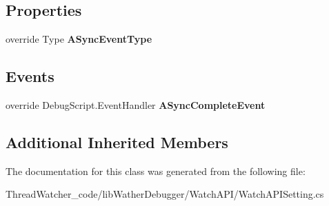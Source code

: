 \subsection*{Properties}
\begin{DoxyCompactItemize}
\item 
\hypertarget{classlib_wather_debugger_1_1_watch_a_p_i_1_1_watch_a_p_i_setting_aa526b2668d58e8615058f655cd7815c9}{override Type {\bfseries A\+Sync\+Event\+Type}}\label{classlib_wather_debugger_1_1_watch_a_p_i_1_1_watch_a_p_i_setting_aa526b2668d58e8615058f655cd7815c9}

\end{DoxyCompactItemize}
\subsection*{Events}
\begin{DoxyCompactItemize}
\item 
\hypertarget{classlib_wather_debugger_1_1_watch_a_p_i_1_1_watch_a_p_i_setting_a48c5962fd665d4cca72d65f805ed4019}{override Debug\+Script.\+Event\+Handler {\bfseries A\+Sync\+Complete\+Event}}\label{classlib_wather_debugger_1_1_watch_a_p_i_1_1_watch_a_p_i_setting_a48c5962fd665d4cca72d65f805ed4019}

\end{DoxyCompactItemize}
\subsection*{Additional Inherited Members}


The documentation for this class was generated from the following file\+:\begin{DoxyCompactItemize}
\item 
Thread\+Watcher\+\_\+code/lib\+Wather\+Debugger/\+Watch\+A\+P\+I/Watch\+A\+P\+I\+Setting.\+cs\end{DoxyCompactItemize}
